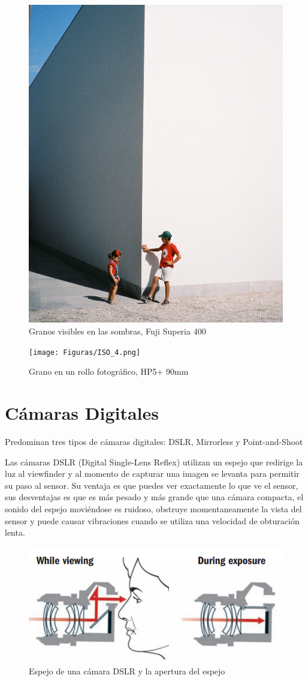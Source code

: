 \documentclass{article}
\begin{document}
\begin{figure}[H]
	\centering
	\includegraphics[width=0.50\linewidth]{Figuras/ISO_3}
	\caption{Granos visibles en las sombras, Fuji Superia 400}
	\label{fig:iso3}
\end{figure}

\begin{figure}[H]
	\centering
	\texttt{[image: Figuras/ISO\_4.png]}
	\caption{Grano en un rollo fotográfico, HP5+ 90mm}
	\label{fig:iso4}
\end{figure}



\section{Cámaras Digitales}

Predominan tres tipos de cámaras digitales: DSLR, Mirrorless y Point-and-Shoot 

Las cámaras DSLR (Digital Single-Lens Reflex) utilizan un espejo que redirige la luz al viewfinder y al momento de capturar una imagen se levanta para permitir su paso al sensor. Su ventaja es que puedes ver exactamente lo que ve el sensor, sus desventajas es que es más pesado y más grande que una cámara compacta, el sonido del espejo moviéndose es ruidoso, obstruye momentaneamente la vista del sensor y puede causar vibraciones cuando se utiliza una velocidad de obturación lenta.

\begin{figure}[H]
	\centering
	\includegraphics[width=0.65\linewidth]{Figuras/DSLR}
	\caption{Espejo de una cámara DSLR y la apertura del espejo}
	\label{fig:dslr}
\end{figure}
\end{document}
